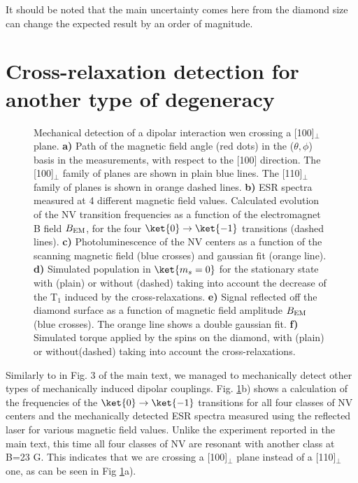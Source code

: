 \documentclass[preprintnumbers,amsmath,amssymb,onecolumn,12pt]{revtex4}
\begin{document}
It should be noted that the main uncertainty comes here from the diamond size can change the expected result by an order of magnitude.

\section{Cross-relaxation detection for another type of degeneracy}

\begin{figure}[!ht]
  \centering {}
  \caption{Mechanical detection of a dipolar interaction wen crossing a [100]$_\perp$ plane. \textbf{a)} Path of the magnetic field angle (red dots) in the ($\theta , \phi$) basis in the measurements, with respect to the [100] direction. The [100]$_\perp$ family of planes are shown in plain blue lines. The [110]$_\perp$ family of planes is shown in orange dashed lines. \textbf{b)} ESR spectra measured at 4 different magnetic field values. Calculated evolution of the NV transition frequencies as a function of the electromagnet B field $B_{\rm EM}$, for the four $\ket{0} \to \ket{-1}$ transitions (dashed lines). \textbf{c)} Photoluminescence of the NV centers as a function of the scanning magnetic field (blue crosses) and gaussian fit (orange line). \textbf{d)} Simulated population in $\ket{m_s=0}$ for the stationary state with (plain) or without (dashed) taking into account the decrease of the T$_1$ induced by the cross-relaxations.
  \textbf{e)} Signal reflected off the diamond surface as a function of magnetic field amplitude $B_{\rm EM}$ (blue crosses). The orange line shows a double gaussian fit. \textbf{f)} Simulated torque applied by the spins on the diamond, with (plain) or without(dashed) taking into account the cross-relaxations.}
	\label{CR_22}
\end{figure}

Similarly to in Fig. 3 of the main text, we managed to mechanically detect other types of mechanically induced dipolar couplings.
Fig. \ref{CR_22}b) shows a calculation of the frequencies of the $\ket{0} \to \ket{-1}$ transitions for all four classes of NV centers and the mechanically detected ESR spectra measured using the reflected laser for various magnetic field values. Unlike the experiment reported in the main text, this time all four classes of NV are resonant with another class at B=23 G. This indicates that we are crossing a [100]$_\perp$ plane instead of a [110]$_\perp$ one, as can be seen in Fig \ref{CR_22}a).
\end{document}
